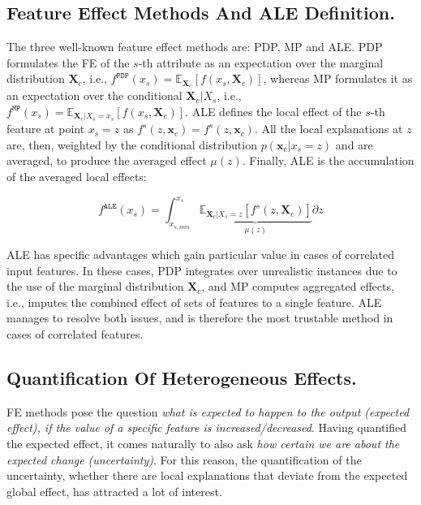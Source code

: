\documentclass[twoside]{article}
\newcommand{\dfdx}{f^s}
\newcommand{\xc}{\mathbf{x}_c}
\newcommand{\Xcb}{\mathbf{X}_c}
\begin{document}
\subsection{Feature Effect Methods And ALE Definition.}
\label{sec:feat-effect-meth}

The three well-known feature effect methods are: PDP, MP and ALE. PDP
formulates the FE of the \(s\)-th attribute as an expectation over the
marginal distribution \(\mathbf{X}_c\), i.e.,
\(f^{\mathtt{PDP}}(x_s) =
\mathbb{E}_{\mathbf{X}_c}[f(x_s,\mathbf{X}_c)]\), whereas MP
formulates it as an expectation over the conditional
\(\mathbf{X}_c|X_s\), i.e.,
\(f^{\mathtt{MP}}(x_s) = \mathbb{E}_{\mathbf{X}_c|X_s = x_s}[f(x_s,
\mathbf{X}_c)]\). ALE defines the local effect of the \(s\)-th feature
at point \(x_s = z\) as \(f^s(z, \xc) = \dfdx (z, \xc)\). All the
local explanations at \(z\) are, then, weighted by the conditional
distribution \(p(\xc|x_s=z)\) and are averaged, to produce the
averaged effect \(\mu(z)\). Finally, ALE is the accumulation of the
averaged local effects:

\begin{equation}
  \label{eq:ALE}
  f^{\mathtt{ALE}}(x_s) = \int_{x_{s,min}}^{x_s} \underbrace{\mathbb{E}_{\Xcb|X_s=z}\left [f^s (z, \Xcb)\right ]}_{\mu(z)} \partial z
\end{equation}


ALE has specific advantages which gain particular value in cases of
correlated input features. In these cases, PDP integrates over
unrealistic instances due to the use of the marginal distribution
\(\mathbf{X}_c \), and MP computes aggregated effects, i.e., imputes
the combined effect of sets of features to a single feature. ALE
manages to resolve both issues, and is therefore the most trustable
method in cases of correlated features.

\subsection{Quantification Of Heterogeneous Effects.}
\label{sec:quant-heter-effects}

FE methods pose the question \textit{what is expected to happen to the
  output (expected effect), if the value of a specific feature is
  increased/decreased}. Having quantified the expected effect, it
comes naturally to also ask \textit{how certain we are about the
  expected change (uncertainty)}. For this reason, the quantification
of the uncertainty, whether there are local explanations that deviate
from the expected global effect, has attracted a lot of interest.
\end{document}
